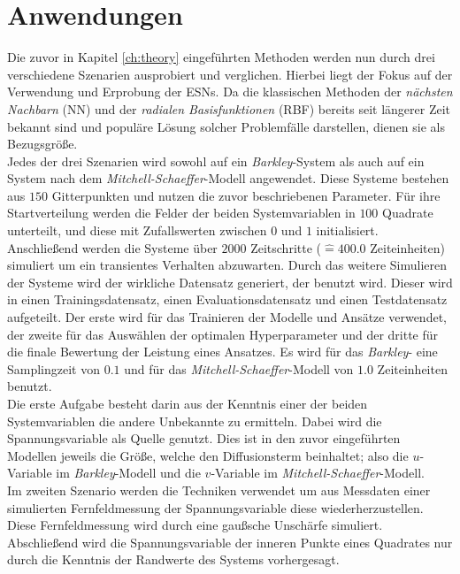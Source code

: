 \chapter{Anwendungen}
\label{ch:experiments}

Die zuvor in Kapitel \ref{ch:theory} eingeführten Methoden werden nun durch drei verschiedene Szenarien ausprobiert und verglichen. Hierbei liegt der Fokus auf der Verwendung und Erprobung der \textsc{ESN}s. Da die klassischen Methoden der \textit{nächsten Nachbarn} (\textsc{NN}) und der \textit{radialen Basisfunktionen} (\textsc{RBF}) bereits seit längerer Zeit bekannt sind und populäre Lösung solcher Problemfälle darstellen, dienen sie als Bezugsgröße.\\

Jedes der drei Szenarien wird sowohl auf ein \textit{Barkley}-System als auch auf ein System nach dem \textit{Mitchell-Schaeffer}-Modell angewendet. Diese Systeme bestehen aus $150$ Gitterpunkten und nutzen die zuvor beschriebenen Parameter. Für ihre Startverteilung werden die Felder der beiden Systemvariablen in $100$ Quadrate unterteilt, und diese mit Zufallswerten zwischen $0$ und $1$ initialisiert. Anschließend werden die Systeme über $2000$ Zeitschritte ($\widehat{=} 400.0$ Zeiteinheiten) simuliert um ein transientes Verhalten abzuwarten. Durch das weitere Simulieren der Systeme wird der wirkliche Datensatz generiert, der benutzt wird. Dieser wird in einen Trainingsdatensatz, einen Evaluationsdatensatz und einen Testdatensatz aufgeteilt. Der erste wird für das Trainieren der Modelle und Ansätze verwendet, der zweite für das Auswählen der optimalen Hyperparameter und der dritte für die finale Bewertung der Leistung eines Ansatzes. Es wird für das \textit{Barkley}- eine Samplingzeit von $0.1$ und für das \textit{Mitchell-Schaeffer}-Modell von $1.0$ Zeiteinheiten benutzt.\\
 
Die erste Aufgabe besteht darin aus der Kenntnis einer der beiden Systemvariablen die andere Unbekannte zu ermitteln. Dabei wird die Spannungsvariable als Quelle genutzt. Dies ist in den zuvor eingeführten Modellen jeweils die Größe, welche den Diffusionsterm beinhaltet; also die $u$-Variable im \textit{Barkley}-Modell und die $v$-Variable im \textit{Mitchell-Schaeffer}-Modell.\\
Im zweiten Szenario werden die Techniken verwendet um aus Messdaten einer simulierten Fernfeldmessung der Spannungsvariable  diese wiederherzustellen. Diese Fernfeldmessung wird durch eine gaußsche Unschärfe simuliert.\\
Abschließend wird die Spannungsvariable der inneren Punkte eines Quadrates nur durch die Kenntnis der Randwerte des Systems vorhergesagt.\\

